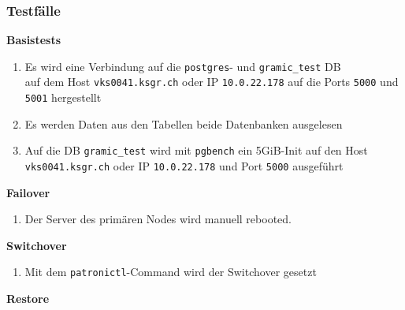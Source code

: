 
\begin{flushleft}
    \subsubsection{Testfälle}
    \begin{description}
        \item \textbf{Basistests}\hfill \\
        \begin{enumerate}
            \item Es wird eine Verbindung auf die \texttt{postgres}- und \texttt{gramic\_test} DB\\ auf dem Host \texttt{vks0041.ksgr.ch} oder IP \texttt{10.0.22.178} auf die Ports \texttt{5000} und \texttt{5001} hergestellt
            \item Es werden Daten aus den Tabellen beide Datenbanken ausgelesen
            \item Auf die DB \texttt{gramic\_test} wird mit \texttt{pgbench} ein 5GiB-Init auf den Host \texttt{vks0041.ksgr.ch} oder IP \texttt{10.0.22.178} und Port \texttt{5000} ausgeführt
        \end{enumerate}
        \item \textbf{Failover}\hfill \\
        \begin{enumerate}[resume]
            \item Der Server des primären Nodes wird manuell rebooted.
        \end{enumerate}
        \item \textbf{Switchover}\hfill \\
        \begin{enumerate}[resume]
            \item Mit dem \texttt{patronictl}-Command wird der Switchover gesetzt
        \end{enumerate}
        \item \textbf{Restore}\hfill \\

\end{description}
\end{flushleft}
